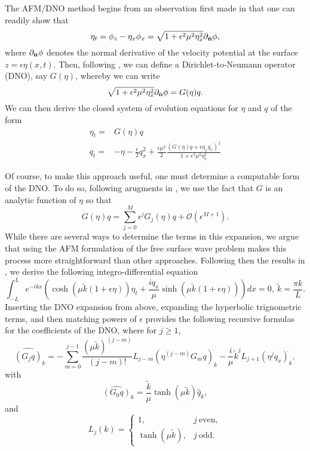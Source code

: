 The AFM/DNO method begins from an observation first made in \cite{zakharov} that one can readily show that 
\[
\eta_{t} = \phi_{z} - \eta_{x}\phi_{x} = \sqrt{1+\epsilon^{2}\mu^{2}\eta_{x}^{2}}\partial_{\hat{{\bf n}}} \phi,
\]
where $\partial_{\hat{{\bf n}}} \phi$ denotes the normal derivative of the velocity potential at the surface $z=\epsilon\eta(x,t)$.  Then, following \cite{zakharov}, we can define a Dirichlet-to-Neumann operator (DNO), say $G(\eta)$, whereby we can write 
\[
\sqrt{1+\epsilon^{2}\mu^{2}\eta_{x}^{2}}\partial_{\hat{{\bf n}}} \phi = G(\eta)q.
\]
We can then derive the closed system of evolution equations for $\eta$ and $q$ of the form 
\begin{align}
\eta_{t} = & G(\eta)q \\ 
q_{t} = & -\eta -\frac{\epsilon}{2}q_{x}^{2} + \frac{\epsilon\mu^{2}}{2}\frac{\left(G(\eta)q + \epsilon \eta_{x}q_{x}\right)^{2}}{1+\epsilon^{2}\mu^{2}\eta_{x}^{2}}
\end{align}

Of course, to make this approach useful, one must determine a computable form of the DNO.  To do so, following arugments in \cite{craig}, we use the fact that $G$ is an analytic function of $\eta$ so that 
\[
G(\eta)q = \sum_{j=0}^{M} \epsilon^{j}G_{j}(\eta)q + \mathcal{O}(\epsilon^{M+1}).
\]
While there are several ways to determine the terms in this expansion, we argue that using the AFM formulation of the free surface wave problem makes this process more straightforward than other approaches.  Following then the results in \cite{afm}, we derive the following integro-differential equation 
\[
\int_{-L}^{L}e^{-ikx}\left(\cosh(\mu \tilde{k} (1 + \epsilon\eta))\eta_{t} + \frac{iq_{x}}{\mu}\sinh(\mu \tilde{k} (1 + \epsilon\eta)) \right) dx = 0, ~ \tilde{k} = \frac{\pi k}{L}.
\]
Inserting the DNO expansion from above, expanding the hyperbolic trignometric terms, and then matching powers of $\epsilon$ provides the following recursive formulas for the coefficients of the DNO, where for $j\geq 1$,  
\begin{equation}
\widehat{\left(G_{j}q \right)}_{k} = -\sum_{m=0}^{j-1} \frac{(\mu\tilde{k})^{(j-m)}}{(j-m)!}L_{j-m} \left(\eta^{(j-m)}G_{m}q\right)^{\widehat{}}_{k} - \frac{i}{\mu}\tilde{k}^{j}L_{j+1} \left(\eta^{j}q_{x}\right)^{\widehat{}}_{k}, 
\label{dnorecurs}
\end{equation}
with 
\[
\widehat{\left(G_{0}q \right)}_{k} = \frac{\tilde{k}}{\mu}\tanh(\mu\tilde{k})\hat{q}_{k}, 
\]
and 
\[
L_{j}(k) = \left\{
\begin{array}{rl}
1, & j~\mbox{even},\\
\tanh(\mu\tilde{k}), & j~\mbox{odd}.
\end{array}
\right.
\]